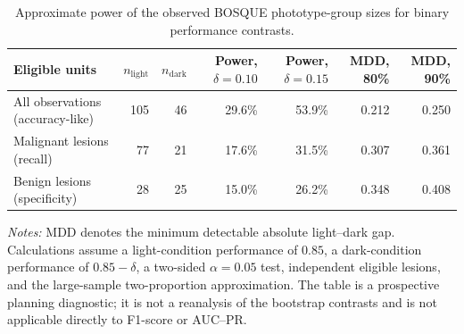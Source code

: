 \begin{table}[h!]
\centering
\scriptsize
\caption{Approximate power of the observed BOSQUE phototype-group sizes for
binary performance contrasts.}
\label{tab:app-orp-current-power}
\setlength{\tabcolsep}{3.2pt}
\renewcommand{\arraystretch}{1.10}
\begin{tabular}{@{}lrrrrrr@{}}
\toprule
\textbf{Eligible units} & $n_{\mathrm{light}}$ & $n_{\mathrm{dark}}$ &
\textbf{Power, $\delta=0.10$} & \textbf{Power, $\delta=0.15$} &
\textbf{MDD, 80\%} & \textbf{MDD, 90\%} \\
\midrule
All observations (accuracy-like) & 105 & 46 & 29.6\% & 53.9\% & 0.212 & 0.250 \\
Malignant lesions (recall) & 77 & 21 & 17.6\% & 31.5\% & 0.307 & 0.361 \\
Benign lesions (specificity) & 28 & 25 & 15.0\% & 26.2\% & 0.348 & 0.408 \\
\bottomrule
\end{tabular}

\vspace{2pt}
\parbox{0.98\textwidth}{\footnotesize
\textit{Notes:} MDD denotes the minimum detectable absolute light--dark gap.
Calculations assume a light-condition performance of $0.85$, a dark-condition
performance of $0.85-\delta$, a two-sided $\alpha=0.05$ test, independent
eligible lesions, and the large-sample two-proportion approximation. The table
is a prospective planning diagnostic; it is not a reanalysis of the bootstrap
contrasts and is not applicable directly to F1-score or AUC--PR.}
\end{table}
